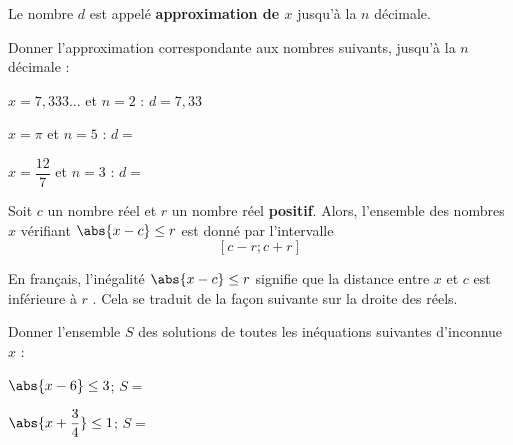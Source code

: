 \documentclass{article}
\begin{document}
\begin{remark}
Le nombre $d$ est appelé \textbf{approximation de $x$} jusqu'à la $n$\ieme{} décimale.
\end{remark}
\begin{example}
Donner l'approximation correspondante aux nombres suivants, jusqu'à la $n$\ieme{} décimale :
\begin{enumquestions}
\item $x = 7,333\dots$ et $n = 2$ : $d = 7,33$
\item $x = \pi$ et $n = 5$ : $d = $ \answersline 
\item $x = \dfrac{12}{7}$ et $n = 3$ : $d = $ \answersline 
\end{enumquestions}
\end{example}
\begin{proposition}
Soit $c$ un nombre réel et $r$ un nombre réel \textbf{positif}. Alors, l'ensemble des nombres $x$ vérifiant $\abs{x - c} \leq r$ est donné par l'intervalle
\begin{equation*}
\left[c-r;c+r\right]
\end{equation*}
\end{proposition}
\begin{remark}
En français, l'inégalité $\abs{x - c} \leq r$ signifie que \og la distance entre $x$ et $c$ est inférieure à $r$ \fg. Cela se traduit de la façon suivante sur la droite des réels.

\begin{center}
\end{center}
\end{remark}
\begin{example}
Donner l'ensemble $S$ des solutions  de toutes les inéquations suivantes d'inconnue $x$ :
\begin{enumquestions}
\item $\abs{x-6} \leq 3$; $S = $ \answersline
\item $\abs{x + \dfrac{3}{4}} \leq 1$; $S = $ \answersline
\end{enumquestions}
\end{example}
\end{document}
